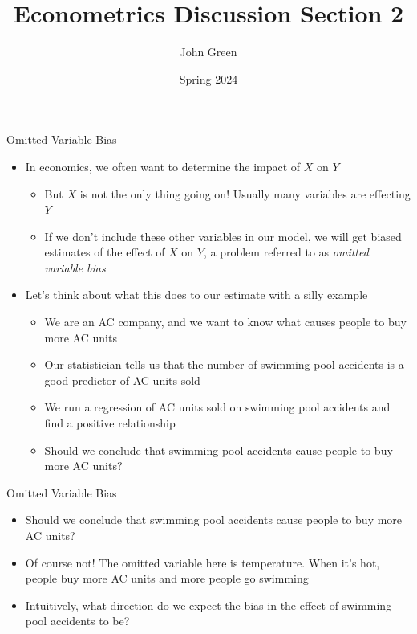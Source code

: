\documentclass[aspectratio=169]{beamer}
\title{Econometrics Discussion Section 2}
\author{John Green}
\date{Spring 2024}
\begin{document}
\begin{frame}
    \titlepage 
\end{frame}

\begin{frame}{Omitted Variable Bias}
    \begin{itemize}
        \item In economics, we often want to determine the impact of $X$ on $Y$
        \begin{itemize}
            \item But $X$ is not the only thing going on! Usually many variables are effecting $Y$
            \item If we don't include these other variables in our model, we will get biased estimates of the effect of $X$ on $Y$, a problem referred to as \textit{omitted variable bias}
        \end{itemize}
        \item Let's think about what this does to our estimate with a silly example
        \begin{itemize}
            \item We are an AC company, and we want to know what causes people to buy more AC units
            \item Our statistician tells us that the number of swimming pool accidents is a good predictor of AC units sold
            \item We run a regression of AC units sold on swimming pool accidents and find a positive relationship
            \item Should we conclude that swimming pool accidents cause people to buy more AC units?
        \end{itemize} 
    \end{itemize}
\end{frame}

\begin{frame}{Omitted Variable Bias}
    \begin{itemize}
        \item Should we conclude that swimming pool accidents cause people to buy more AC units?
        \item Of course not! The omitted variable here is temperature. When it's hot, people buy more AC units and more people go swimming
        \item Intuitively, what direction do we expect the bias in the effect of swimming pool accidents to be?
    \end{itemize}
\end{frame}
\end{document}
